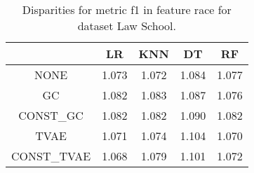 \begin{table}
\caption{Disparities for metric f1 in feature race for dataset Law School.}
\label{tab:disp-LAW SCHOOL-race-f1}
\begin{tabular}{ccccc}
\toprule
 & LR & KNN & DT & RF \\
\midrule
NONE & 1.073 & 1.072 & 1.084 & 1.077 \\
GC & 1.082 & 1.083 & 1.087 & 1.076 \\
CONST\_GC & 1.082 & 1.082 & 1.090 & 1.082 \\
TVAE & 1.071 & 1.074 & 1.104 & 1.070 \\
CONST\_TVAE & 1.068 & 1.079 & 1.101 & 1.072 \\
\bottomrule
\end{tabular}
\end{table}
